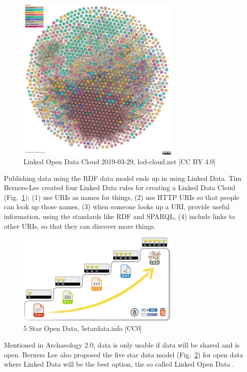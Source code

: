 \documentclass[twocolumn]{autart}
\begin{document}
\begin{figure}[!htb]
\begin{center}
\includegraphics[width=8cm]{lod-cloud.pdf}
\caption{Linked Open Data Cloud 2019-03-29, lod-cloud.net [CC BY 4.0]}
\label{figlodc}
\end{center}
\end{figure}

Publishing data using the RDF data model ends up in using Linked Data. Tim Berners-Lee created four Linked Data rules \cite{bernerslee_linkeddata} for creating a Linked Data Cloud (Fig.~\ref{figlodc}): (1) use URIs as names for things, (2) use HTTP URIs so that people can look up those names, (3) when someone looks up a URI, provide useful information, using the standards like RDF and SPARQL, (4) include links to other URIs, so that they can discover more things.

\begin{figure}[!htb]
\begin{center}
\includegraphics[width=8cm]{5-star-steps.png}
\caption{5 Star Open Data, 5stardata.info [CC0]}
\label{figfivestar}
\end{center}
\end{figure}

Mentioned in Archaeology 2.0, data is only usable if data will be shared and is open. Berners Lee also proposed the five star data model (Fig.~\ref{figfivestar}) for open data where Linked Data will be the best option, the so called Linked Open Data \cite{hausenblas_5star}.
\end{document}
